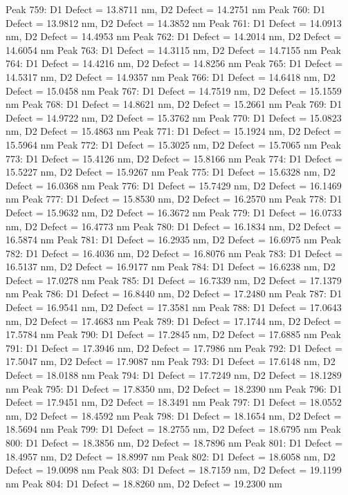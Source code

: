 \documentclass{article}
\begin{document}
Peak 759: D1 Defect = 13.8711 nm, D2 Defect = 14.2751 nm
Peak 760: D1 Defect = 13.9812 nm, D2 Defect = 14.3852 nm
Peak 761: D1 Defect = 14.0913 nm, D2 Defect = 14.4953 nm
Peak 762: D1 Defect = 14.2014 nm, D2 Defect = 14.6054 nm
Peak 763: D1 Defect = 14.3115 nm, D2 Defect = 14.7155 nm
Peak 764: D1 Defect = 14.4216 nm, D2 Defect = 14.8256 nm
Peak 765: D1 Defect = 14.5317 nm, D2 Defect = 14.9357 nm
Peak 766: D1 Defect = 14.6418 nm, D2 Defect = 15.0458 nm
Peak 767: D1 Defect = 14.7519 nm, D2 Defect = 15.1559 nm
Peak 768: D1 Defect = 14.8621 nm, D2 Defect = 15.2661 nm
Peak 769: D1 Defect = 14.9722 nm, D2 Defect = 15.3762 nm
Peak 770: D1 Defect = 15.0823 nm, D2 Defect = 15.4863 nm
Peak 771: D1 Defect = 15.1924 nm, D2 Defect = 15.5964 nm
Peak 772: D1 Defect = 15.3025 nm, D2 Defect = 15.7065 nm
Peak 773: D1 Defect = 15.4126 nm, D2 Defect = 15.8166 nm
Peak 774: D1 Defect = 15.5227 nm, D2 Defect = 15.9267 nm
Peak 775: D1 Defect = 15.6328 nm, D2 Defect = 16.0368 nm
Peak 776: D1 Defect = 15.7429 nm, D2 Defect = 16.1469 nm
Peak 777: D1 Defect = 15.8530 nm, D2 Defect = 16.2570 nm
Peak 778: D1 Defect = 15.9632 nm, D2 Defect = 16.3672 nm
Peak 779: D1 Defect = 16.0733 nm, D2 Defect = 16.4773 nm
Peak 780: D1 Defect = 16.1834 nm, D2 Defect = 16.5874 nm
Peak 781: D1 Defect = 16.2935 nm, D2 Defect = 16.6975 nm
Peak 782: D1 Defect = 16.4036 nm, D2 Defect = 16.8076 nm
Peak 783: D1 Defect = 16.5137 nm, D2 Defect = 16.9177 nm
Peak 784: D1 Defect = 16.6238 nm, D2 Defect = 17.0278 nm
Peak 785: D1 Defect = 16.7339 nm, D2 Defect = 17.1379 nm
Peak 786: D1 Defect = 16.8440 nm, D2 Defect = 17.2480 nm
Peak 787: D1 Defect = 16.9541 nm, D2 Defect = 17.3581 nm
Peak 788: D1 Defect = 17.0643 nm, D2 Defect = 17.4683 nm
Peak 789: D1 Defect = 17.1744 nm, D2 Defect = 17.5784 nm
Peak 790: D1 Defect = 17.2845 nm, D2 Defect = 17.6885 nm
Peak 791: D1 Defect = 17.3946 nm, D2 Defect = 17.7986 nm
Peak 792: D1 Defect = 17.5047 nm, D2 Defect = 17.9087 nm
Peak 793: D1 Defect = 17.6148 nm, D2 Defect = 18.0188 nm
Peak 794: D1 Defect = 17.7249 nm, D2 Defect = 18.1289 nm
Peak 795: D1 Defect = 17.8350 nm, D2 Defect = 18.2390 nm
Peak 796: D1 Defect = 17.9451 nm, D2 Defect = 18.3491 nm
Peak 797: D1 Defect = 18.0552 nm, D2 Defect = 18.4592 nm
Peak 798: D1 Defect = 18.1654 nm, D2 Defect = 18.5694 nm
Peak 799: D1 Defect = 18.2755 nm, D2 Defect = 18.6795 nm
Peak 800: D1 Defect = 18.3856 nm, D2 Defect = 18.7896 nm
Peak 801: D1 Defect = 18.4957 nm, D2 Defect = 18.8997 nm
Peak 802: D1 Defect = 18.6058 nm, D2 Defect = 19.0098 nm
Peak 803: D1 Defect = 18.7159 nm, D2 Defect = 19.1199 nm
Peak 804: D1 Defect = 18.8260 nm, D2 Defect = 19.2300 nm
\end{document}
